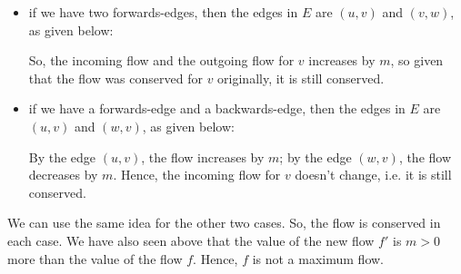 \documentclass[a4paper, openany]{memoir}
\begin{document}
    \begin{itemize}
        \item if we have two forwards-edges, then the edges in $E$ are $(u, v)$ and $(v, w)$, as given below:
        \begin{figure}[H]
            \centering
        \end{figure}
        \noindent So, the incoming flow and the outgoing flow for $v$ increases by $m$, so given that the flow was conserved for $v$ originally, it is still conserved.

        \item if we have a forwards-edge and a backwards-edge, then the edges in $E$ are $(u, v)$ and $(w, v)$, as given below:
        \begin{figure}[H]
            \centering
        \end{figure}
        \noindent By the edge $(u, v)$, the flow increases by $m$; by the edge $(w, v)$, the flow decreases by $m$. Hence, the incoming flow for $v$ doesn't change, i.e. it is still conserved.
    \end{itemize}
    We can use the same idea for the other two cases. So, the flow is conserved in each case. We have also seen above that the value of the new flow $f'$ is $m > 0$ more than the value of the flow $f$. Hence, $f$ is not a maximum flow.
\end{document}
